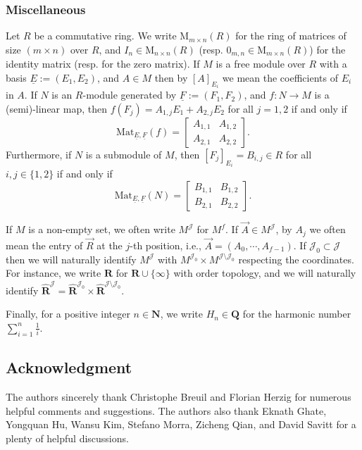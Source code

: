 \documentclass[11pt]{amsart}
\theoremstyle{definition}
\numberwithin{equation}{subsection}
\theoremstyle{plain}
\theoremstyle{plain}
\theoremstyle{plain}
\theoremstyle{plain}
\theoremstyle{plain}
\theoremstyle{plain}
\theoremstyle{plain}
\theoremstyle{plain}
\theoremstyle{plain}
\theoremstyle{plain}
\theoremstyle{plain}
\theoremstyle{plain}
\theoremstyle{definition}
\theoremstyle{definition}
\theoremstyle{definition}
\theoremstyle{remark}
\renewcommand{\(}{\textup{(}}
\renewcommand{\)}{\textup{)}}
\newcommand{\N}{\mathbf{N}}
\newcommand{\Q}{\mathbf{Q}}
\newcommand{\R}{\mathbf{R}}
\newcommand{\cJ}{\mathcal{J}}
\begin{document}
\subsubsection{Miscellaneous}\label{subsubsec: Miscellaneous}
Let $R$ be a commutative ring. We write $\mathrm{M}_{m\times n}(R)$ for the ring of matrices of size $(m\times n)$ over $R$, and $I_n\in \mathrm{M}_{n\times n}(R)$ (resp. $0_{m,n}\in\mathrm{M}_{m\times n}(R)$) for the identity matrix (resp. for the zero matrix). If $M$ is a free module over $R$ with a basis $\underline{E}:=(E_1,E_2)$, and $A\in M$ then by $[A]_{E_i}$ we mean the coefficients of $E_i$ in $A$. If $N$ is an $R$-module generated by $\underline{F}:=(F_1,F_2)$, and $f:N\rightarrow M$ is a (semi)-linear map, then $f(F_j)=A_{1,j}E_1+A_{2,j}E_2$ for all $j=1,2$ if and only if
$$\mathrm{Mat}_{\underline{E},\underline{F}}(f)=
\begin{bmatrix}
  A_{1,1} & A_{1,2} \\
  A_{2,1} & A_{2,2}
\end{bmatrix}.$$
Furthermore, if $N$ is a submodule of $M$, then $[F_j]_{E_i}=B_{i,j}\in R$ for all $i,j\in\{1,2\}$ if and only if
$$\mathrm{Mat}_{\underline{E},\underline{F}}(N)=
\begin{bmatrix}
  B_{1,1} & B_{1,2} \\
  B_{2,1} & B_{2,2}
\end{bmatrix}.$$


If $M$ is a non-empty set, we often write $M^{\cJ}$ for $M^f$. If $\vec{A}\in M^\cJ$, by $A_j$ we often mean the entry of $\vec{R}$ at the $j$-th position, i.e., $\vec{A}=(A_0,\cdots,A_{f-1})$. If $\cJ_0\subset \cJ$ then we will naturally identify $M^\cJ$ with $M^{\cJ_0}\times M^{\cJ\setminus\cJ_0}$ respecting the coordinates. For instance, we write $\hat{\R}$ for $\R\cup\{\infty\}$ with order topology, and we will naturally identify $\hat{\R}^\cJ=\hat{\R}^{\cJ_0}\times \hat{\R}^{\cJ\setminus \cJ_0}$.


Finally, for a positive integer $n\in\N$, we write $H_n\in\Q$ for the harmonic number $\sum_{i=1}^n\frac{1}{i}$.

\subsection{Acknowledgment}
The authors sincerely thank Christophe Breuil and Florian Herzig for numerous helpful comments and suggestions. The authors also thank Eknath Ghate, Yongquan Hu, Wansu Kim, Stefano Morra, Zicheng Qian, and David Savitt for a plenty of helpful discussions.
\end{document}
